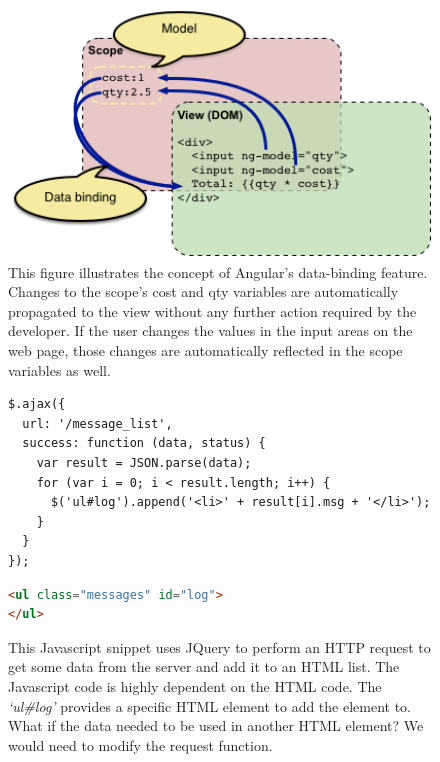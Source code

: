 \begin{figure}
\begin{center}
\includegraphics[height=\textheight,width=5in,keepaspectratio]{figures/angular_data_binding.png}
\caption[Angular data binding \cite{angularconcepts2014}]{This figure illustrates the concept of Angular's data-binding feature. Changes to the scope's cost and qty variables are automatically propagated to the view without any further action required by the developer. If the user changes the values in the input areas on the web page, those changes are automatically reflected in the scope variables as well\cite{angularconcepts2014}.\label{fig:angular_data_binding}}
\end{center}
\end{figure}

\begin{figure}
\begin{center}
\begin{lstlisting}
$.ajax({
  url: '/message_list',
  success: function (data, status) {
    var result = JSON.parse(data);
    for (var i = 0; i < result.length; i++) {
      $('ul#log').append('<li>' + result[i].msg + '</li>');
    }
  }
});
\end{lstlisting}
\begin{lstlisting}[language=HTML]
<ul class="messages" id="log">
</ul>
\end{lstlisting}
\caption[JQuery DOM Manipulation]{This Javascript snippet uses JQuery to perform an HTTP request to get some data from the server and add it to an HTML list. The Javascript code is highly dependent on the HTML code. The {\em{}`ul\#log'} provides a specific HTML element to add the element to. What if the data needed to be used in another HTML element? We would need to modify the request function.\label{fig:jquery_example}}
\end{center}
\end{figure}

